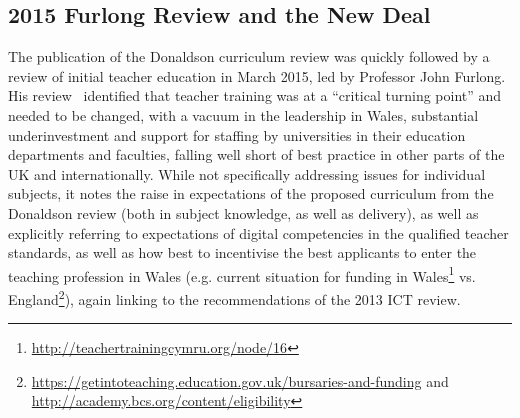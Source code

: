 \documentclass{sig-alternate}
\begin{document}


\subsection{2015 Furlong Review and the New Deal}

The publication of the Donaldson curriculum review was quickly
followed by a review of initial teacher education in March 2015, led
by Professor John Furlong. His review~\cite{Furlong:2015} identified
that teacher training was at a ``critical turning point'' and needed
to be changed, with a vacuum in the leadership in Wales, substantial
underinvestment and support for staffing by universities in their
education departments and faculties, falling well short of best
practice in other parts of the UK and internationally. While not
specifically addressing issues for individual subjects, it notes the
raise in expectations of the proposed curriculum from the Donaldson
review (both in subject knowledge, as well as delivery), as well as
explicitly referring to expectations of digital competencies in the
qualified teacher standards, as well as how best to incentivise the
best applicants to enter the teaching profession in Wales
(e.g. current situation for funding in
Wales\footnote{\url{http://teachertrainingcymru.org/node/16}}
vs. England\footnote{\url{https://getintoteaching.education.gov.uk/bursaries-and-funding}
and \url{http://academy.bcs.org/content/eligibility}}), again linking
to the recommendations of the 2013 ICT review.
\end{document}
